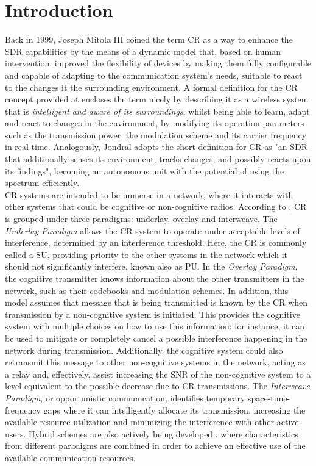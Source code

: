 \acresetall
\chapter{Introduction}\label{ch:intro}

Back in 1999, Joseph Mitola III coined the term \ac{CR}\cite{Mitola1999} as a way to enhance the \ac{SDR} capabilities by the means of a dynamic model that, based on human intervention, improved the flexibility of devices by making them fully configurable and capable of adapting to the communication system's needs, suitable to react to the changes it the surrounding environment. A formal definition for the \ac{CR} concept provided at \cite{Haykin2005} encloses the term nicely by describing it as a wireless system that is \emph{intelligent and aware of its surroundings}, whilst being able to learn, adapt and react to changes in the environment, by modifying its operation parameters such as the transmission power, the modulation scheme and its carrier frequency in real-time. Analogously, Jondral \cite{Jondral2005} adopts the short definition for \ac{CR} as "an \ac{SDR} that additionally senses its environment, tracks changes, and possibly reacts upon its findings", becoming an autonomous unit with the potential of using the spectrum efficiently.\\

\ac{CR} systems are intended to be immerse in a network, where it interacts with other systems that could be cognitive or non-cognitive radios. According to \cite{Goldsmith}, \ac{CR} is grouped under three paradigms: underlay, overlay and interweave. The \emph{Underlay Paradigm} allows the \ac{CR} system to operate under acceptable levels of interference, determined by an interference threshold. Here, the \ac{CR} is commonly called a \ac{SU}, providing priority to the other systems in the network which it should not significantly interfere, known also as \ac{PU}. In the \emph{Overlay Paradigm}, the cognitive transmitter knows information about the other transmitters in the network, such as their codebooks and modulation schemes. In addition, this model assumes that message that is being transmitted is known by the \ac{CR} when transmission by a non-cognitive system is initiated. This provides the cognitive system with multiple choices on how to use this information: for instance, it can be used to mitigate or completely cancel a possible interference happening in the network during transmission. Additionally, the cognitive system could also retransmit this message to other non-cognitive systems in the network, acting as a relay and, effectively, assist increasing the \ac{SNR} of the non-cognitive system to a level equivalent to the possible decrease due to \ac{CR} transmissions. The \emph{Interweave Paradigm}, or opportunistic communication, identifies temporary space-time-frequency gaps where it can intelligently allocate its transmission, increasing the available resource utilization and minimizing the interference with other active users. Hybrid schemes are also actively being developed \cite{Wu2007} \cite{Kaushik2015} \cite{Wunsch2017a}, where characteristics from different paradigms are combined in order to achieve an effective use of the available communication resources.\\

